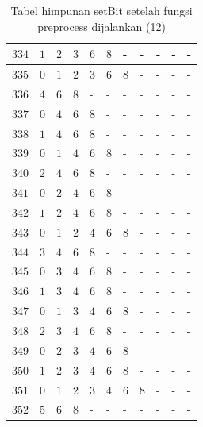 \begin{appendices}
\begin{table}[H]
\begin{tabular} {|l|l|l|l|l|l|l|l|l|l|l|}
  		$ 334 $ & $ 1 $ &$ 2 $ &$ 3 $ &$ 6 $ &$ 8 $ & - &  - &  - &  - &  -   \\ \hline
  		$ 335 $ & $ 0 $ &$ 1 $ &$ 2 $ &$ 3 $ &$ 6 $ &$ 8 $ & - &  - &  - &  -   \\ \hline
  		$ 336 $ & $ 4 $ &$ 6 $ &$ 8 $ & - &  - &  - &  - &  - &  - &  -   \\ \hline
  		$ 337 $ & $ 0 $ &$ 4 $ &$ 6 $ &$ 8 $ & - &  - &  - &  - &  - &  -   \\ \hline
  		$ 338 $ & $ 1 $ &$ 4 $ &$ 6 $ &$ 8 $ & - &  - &  - &  - &  - &  -   \\ \hline
  		$ 339 $ & $ 0 $ &$ 1 $ &$ 4 $ &$ 6 $ &$ 8 $ & - &  - &  - &  - &  -   \\ \hline
  		$ 340 $ & $ 2 $ &$ 4 $ &$ 6 $ &$ 8 $ & - &  - &  - &  - &  - &  -   \\ \hline
  		$ 341 $ & $ 0 $ &$ 2 $ &$ 4 $ &$ 6 $ &$ 8 $ & - &  - &  - &  - &  -   \\ \hline
  		$ 342 $ & $ 1 $ &$ 2 $ &$ 4 $ &$ 6 $ &$ 8 $ & - &  - &  - &  - &  -   \\ \hline
  		$ 343 $ & $ 0 $ &$ 1 $ &$ 2 $ &$ 4 $ &$ 6 $ &$ 8 $ & - &  - &  - &  -   \\ \hline
  		$ 344 $ & $ 3 $ &$ 4 $ &$ 6 $ &$ 8 $ & - &  - &  - &  - &  - &  -   \\ \hline
  		$ 345 $ & $ 0 $ &$ 3 $ &$ 4 $ &$ 6 $ &$ 8 $ & - &  - &  - &  - &  -   \\ \hline
  		$ 346 $ & $ 1 $ &$ 3 $ &$ 4 $ &$ 6 $ &$ 8 $ & - &  - &  - &  - &  -   \\ \hline
  		$ 347 $ & $ 0 $ &$ 1 $ &$ 3 $ &$ 4 $ &$ 6 $ &$ 8 $ & - &  - &  - &  -   \\ \hline
  		$ 348 $ & $ 2 $ &$ 3 $ &$ 4 $ &$ 6 $ &$ 8 $ & - &  - &  - &  - &  -   \\ \hline
  		$ 349 $ & $ 0 $ &$ 2 $ &$ 3 $ &$ 4 $ &$ 6 $ &$ 8 $ & - &  - &  - &  -   \\ \hline
  		$ 350 $ & $ 1 $ &$ 2 $ &$ 3 $ &$ 4 $ &$ 6 $ &$ 8 $ & - &  - &  - &  -   \\ \hline
  		$ 351 $ & $ 0 $ &$ 1 $ &$ 2 $ &$ 3 $ &$ 4 $ &$ 6 $ &$ 8 $ & - &  - &  -   \\ \hline
  		$ 352 $ & $ 5 $ &$ 6 $ &$ 8 $ & - &  - &  - &  - &  - &  - &  -   \\ \hline
  	\end{tabular}\caption{Tabel himpunan setBit setelah fungsi preprocess dijalankan (12)}
  	\label{tab:setbit_12}
  \end{table}
  \begin{table}[H]

\end{table}
\end{appendices}
